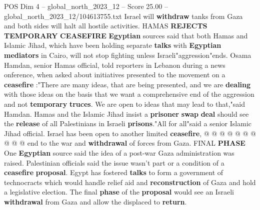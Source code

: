 \begin{textsample}{POS Dim 4 – global\_north\_2023\_12 – Score 25.00 – global\_north\_2023\_12/104613755.txt}
Israel will \textbf{withdraw} tanks from Gaza and both sides will halt all hostile activities.
HAMAS \textbf{REJECTS} \textbf{TEMPORARY} \textbf{CEASEFIRE} \textbf{Egyptian} sources said that both Hamas and Islamic Jihad, which have been holding separate \textbf{talks} with \textbf{Egyptian} \textbf{mediators} in Cairo, will not stop fighting unless Israeli"aggression"ends.
Osama Hamdan, senior Hamas official, told reporters in Lebanon during a news onference, when asked about initiatives presented to the movement on a \textbf{ceasefire} :"There are many ideas, that are being presented, and we are \textbf{dealing} with those ideas on the basis that we want a comprehensive end of the aggression and not \textbf{temporary} \textbf{truces}.
We are open to ideas that may lead to that,"said Hamdan.
Hamas and the Islamic Jihad insist a \textbf{prisoner} \textbf{swap} \textbf{deal} should see the \textbf{release} of all Palestinians in Israeli \textbf{prisons}."All for all"said a senior Islamic Jihad official.
Israel has been open to another limited \textbf{ceasefire}, @ @ @ @ @ @ @ @ @ @ end to the war and \textbf{withdrawal} of forces from Gaza.
FINAL \textbf{PHASE} One \textbf{Egyptian} source said the idea of a post-war Gaza administration was raised.
Palestinian officials said the issue wasn't part or a condition of a \textbf{ceasefire} \textbf{proposal}.
Egypt has fostered \textbf{talks} to form a government of technocracts which would handle relief aid and \textbf{reconstruction} of Gaza and hold a legislative election.
The final \textbf{phase} of the \textbf{proposal} would see an Israeli \textbf{withdrawal} from Gaza and allow the displaced to \textbf{return}.

\end{textsample}
